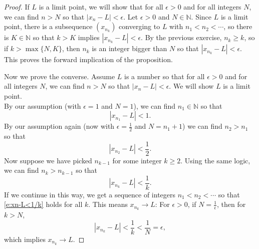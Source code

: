 \documentclass[11pt,dvipsnames]{book}
\numberwithin{figure}{section} %
\numberwithin{table}{section} %
\begin{document}
\begin{proof}
If $L$ is a limit point, we will show  that for all $\epsilon>0$ and for all integers $N$, we can find $n> N$ so that $|x_n-L|<\epsilon$. Let $\epsilon>0$ and $N\in\mathbb{N}$. Since $L$ is a limit point, there is a subsequence $(x_{n_{k}})$ converging to $L$ with $n_{1}<n_{2}<\cdots$, so there is $K\in\mathbb{N}$ so that $k> K$ implies $|x_{n_{k}}-L|<\epsilon$. By the previous exercise, $n_{k}\geq  k$, so if $k> \max\{N,K\}$, then  $n_k$ is an integer bigger than  $N$ so that $|x_{n_{k}}-L|<\epsilon$. This proves the forward implication of the proposition.

Now we prove the converse. Assume $L$ is a number so that for all $\epsilon>0$ and for all integers $N$, we can find $n> N$ so that $|x_n-L|<\epsilon$. We will show $L$ is a limit point. \\

By our assumption (with $\epsilon=1$ and $N=1$), we can find $n_1\in\mathbb{N}$ so that
\[
|x_{n_{1}}-L|<1.
\]
By our assumption again (now with $\epsilon=\frac{1}{2}$ and $N=n_{1}+1$) we can find $n_2>n_1$ so that
\[
|x_{n_{2}}-L|<\frac{1}{2}.
\]
Now suppose we have picked $n_{k-1}$ for some integer $k\geq 2$. Using the same logic, we can find $n_{k}>n_{k-1}$ so that
\begin{equation}
\label{e:xn-L<1/k}
|x_{n_{k}}-L|<\frac{1}{k}.
\end{equation}
If we continue in this way, we get a sequence of integers $n_1<n_2<\cdots $ so that \eqref{e:xn-L<1/k} holds for all $k$. This means $x_{n_k}\rightarrow L$: For $\epsilon>0$, if $N=\frac{1}{\epsilon}$, then for $k> N$,
\[
|x_{n_{k}}-L|<\frac{1}{k}< \frac{1}{N}=\epsilon,
\]
which implies $x_{n_k}\rightarrow L$.
\end{proof}
\end{document}
